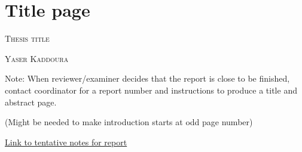 \documentclass[a4paper, 12pt]{report}
\begin{document}

\thispagestyle{empty}
\section*{Title page}

\textsc{\large Thesis title }

\textsc{\large Yaser Kaddoura}

Note: When reviewer/examiner decides that the report is close to be finished,
contact coordinator for a report number and instructions to produce a title and
abstract page.

\newpage\null\thispagestyle{blank}\newpage

\thispagestyle{empty}


\newpage\null\thispagestyle{blank}\newpage

\tableofcontents

\newpage

\listoffigures

\newpage

\listoftables
\newpage




\newpage
\newpage\null(Might be needed to make introduction starts at odd page number)
\thispagestyle{blank}\newpage





\newpage



\newpage



\newpage

\href{https://gist.github.com/YasserKa/cb39b763ff9484e73ba82003c9aae2eb}{Link to tentative notes for report}

\newpage



\newpage

\printbibliography[heading=bibintoc, title={References}]
\end{document}

